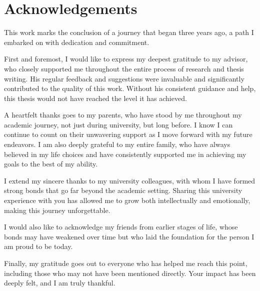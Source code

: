 \chapter*{Acknowledgements}


This work marks the conclusion of a journey that began three years ago, a path I embarked on with dedication and commitment. 

First and foremost, I would like to express my deepest gratitude to my advisor, who closely supported me throughout the entire process of research and thesis writing. His regular feedback and suggestions were invaluable and significantly contributed to the quality of this work. Without his consistent guidance and help, this thesis would not have reached the level it has achieved.

A heartfelt thanks goes to my parents, who have stood by me throughout my academic journey, not just during university, but long before. I know I can continue to count on their unwavering support as I move forward with my future endeavors. I am also deeply grateful to my entire family, who have always believed in my life choices and have consistently supported me in achieving my goals to the best of my ability.

I extend my sincere thanks to my university colleagues, with whom I have formed strong bonds that go far beyond the academic setting. Sharing this university experience with you has allowed me to grow both intellectually and emotionally, making this journey unforgettable.

I would also like to acknowledge my friends from earlier stages of life, whose bonds may have weakened over time but who laid the foundation for the person I am proud to be today.

Finally, my gratitude goes out to everyone who has helped me reach this point, including those who may not have been mentioned directly. Your impact has been deeply felt, and I am truly thankful.

